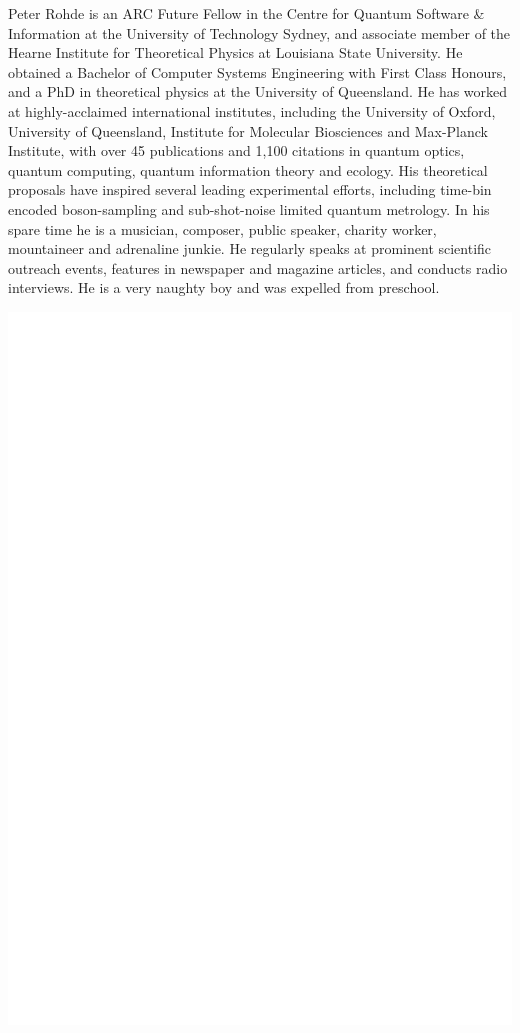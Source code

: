 \documentclass[aps, rmp, twocolumn, amsmath, amssymb, nofootinbib, superscriptaddress, longbibliography, floatfix, table-of-contents, eqsecnum]{revtex4-1}
\begin{document}
Peter Rohde is an ARC Future Fellow in the Centre for Quantum Software \& Information at the University of Technology Sydney, and associate member of the Hearne Institute for Theoretical Physics at Louisiana State University. He obtained a Bachelor of Computer Systems Engineering with First Class Honours, and a PhD in theoretical physics at the University of Queensland. He has worked at highly-acclaimed international institutes, including the University of Oxford, University of Queensland, Institute for Molecular Biosciences and Max-Planck Institute, with over 45 publications and 1,100 citations in quantum optics, quantum computing, quantum information theory and ecology. His theoretical proposals have inspired several leading experimental efforts, including time-bin encoded boson-sampling and sub-shot-noise limited quantum metrology. In his spare time he is a musician, composer, public speaker, charity worker, mountaineer and adrenaline junkie. He regularly speaks at prominent scientific outreach events, features in newspaper and magazine articles, and conducts radio interviews. He is a very naughty boy and was expelled from preschool.

\includegraphics[width=\columnwidth]{photo_zuen_su}
\end{document}
